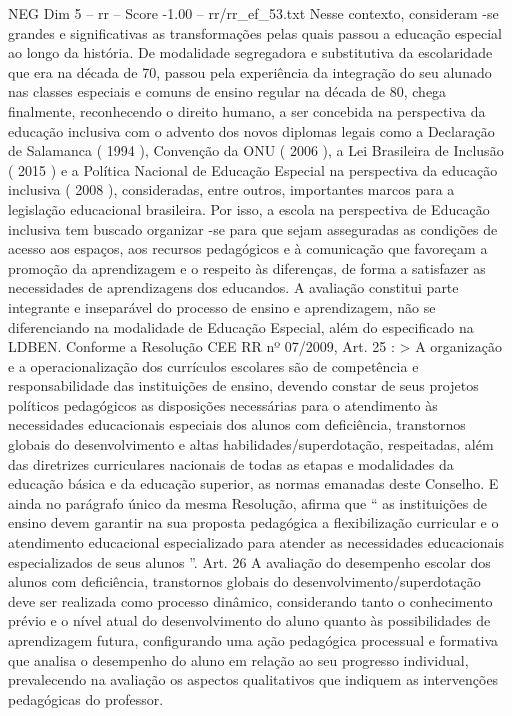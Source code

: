 \begin{textsample}{NEG Dim 5 – rr – Score -1.00 – rr/rr\_ef\_53.txt}
Nesse contexto, consideram -se grandes e significativas as transformações pelas quais passou a educação especial ao longo da história.
De modalidade segregadora e substitutiva da escolaridade que era na década de 70, passou pela experiência da integração do seu alunado nas classes especiais e comuns de ensino regular na década de 80, chega finalmente, reconhecendo o direito humano, a ser concebida na perspectiva da educação inclusiva com o advento dos novos diplomas legais como a Declaração de Salamanca ( 1994 ), Convenção da ONU ( 2006 ), a Lei Brasileira de Inclusão ( 2015 ) e a Política Nacional de Educação Especial na perspectiva da educação inclusiva ( 2008 ), consideradas, entre outros, importantes marcos para a legislação educacional brasileira.
Por isso, a escola na perspectiva de Educação inclusiva tem buscado organizar -se para que sejam asseguradas as condições de acesso aos espaços, aos recursos pedagógicos e à comunicação que favoreçam a promoção da aprendizagem e o respeito às diferenças, de forma a satisfazer as necessidades de aprendizagens dos educandos.
A avaliação constitui parte integrante e inseparável do processo de ensino e aprendizagem, não se diferenciando na modalidade de Educação Especial, além do especificado na LDBEN.
Conforme a Resolução CEE RR nº 07/2009, Art. 25 : > A organização e a operacionalização dos currículos escolares são de competência e responsabilidade das instituições de ensino, devendo constar de seus projetos políticos pedagógicos as disposições necessárias para o atendimento às necessidades educacionais especiais dos alunos com deficiência, transtornos globais do desenvolvimento e altas habilidades/superdotação, respeitadas, além das diretrizes curriculares nacionais de todas as etapas e modalidades da educação básica e da educação superior, as normas emanadas deste Conselho.
E ainda no parágrafo único da mesma Resolução, afirma que “ as instituições de ensino devem garantir na sua proposta pedagógica a flexibilização curricular e o atendimento educacional especializado para atender as necessidades educacionais especializados de seus alunos ”.
Art. 26 A avaliação do desempenho escolar dos alunos com deficiência, transtornos globais do desenvolvimento/superdotação deve ser realizada como processo dinâmico, considerando tanto o conhecimento prévio e o nível atual do desenvolvimento do aluno quanto às possibilidades de aprendizagem futura, configurando uma ação pedagógica processual e formativa que analisa o desempenho do aluno em relação ao seu progresso individual, prevalecendo na avaliação os aspectos qualitativos que indiquem as intervenções pedagógicas do professor.

\end{textsample}
